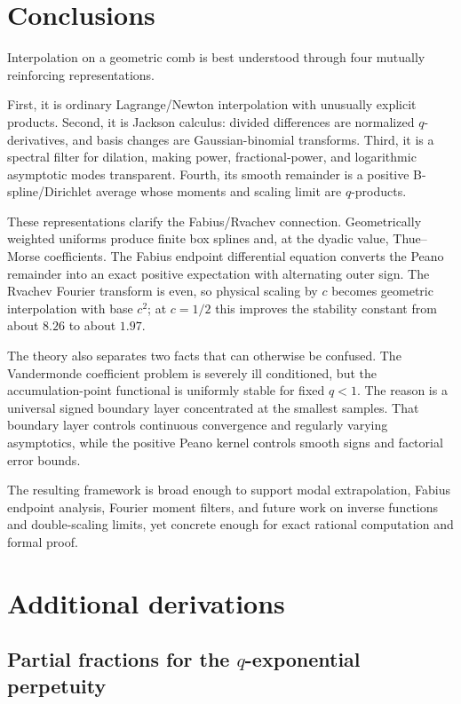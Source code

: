 \documentclass[11pt,oneside]{article}
\numberwithin{equation}{section}
\theoremstyle{definition}
\theoremstyle{remark}
\begin{document}
\section{Conclusions}

Interpolation on a geometric comb is best understood through four mutually
reinforcing representations.

First, it is ordinary Lagrange/Newton interpolation with unusually explicit
products.  Second, it is Jackson calculus: divided differences are normalized
$q$-derivatives, and basis changes are Gaussian-binomial transforms.  Third, it
is a spectral filter for dilation, making power, fractional-power, and
logarithmic asymptotic modes transparent.  Fourth, its smooth remainder is a
positive B-spline/Dirichlet average whose moments and scaling limit are
$q$-products.

These representations clarify the Fabius/Rvachev connection.  Geometrically
weighted uniforms produce finite box splines and, at the dyadic value,
Thue--Morse coefficients.  The Fabius endpoint differential equation converts
the Peano remainder into an exact positive expectation with alternating outer
sign.  The Rvachev Fourier transform is even, so physical scaling by $c$ becomes
geometric interpolation with base $c^2$; at $c=1/2$ this improves the stability
constant from about $8.26$ to about $1.97$.

The theory also separates two facts that can otherwise be confused.  The
Vandermonde coefficient problem is severely ill conditioned, but the
accumulation-point functional is uniformly stable for fixed $q<1$.  The reason
is a universal signed boundary layer concentrated at the smallest samples.
That boundary layer controls continuous convergence and regularly varying
asymptotics, while the positive Peano kernel controls smooth signs and
factorial error bounds.

The resulting framework is broad enough to support modal extrapolation,
Fabius endpoint analysis, Fourier moment filters, and future work on inverse
functions and double-scaling limits, yet concrete enough for exact rational
computation and formal proof.

\appendix

\section{Additional derivations}

\subsection{Partial fractions for the $q$-exponential perpetuity}
\end{document}
